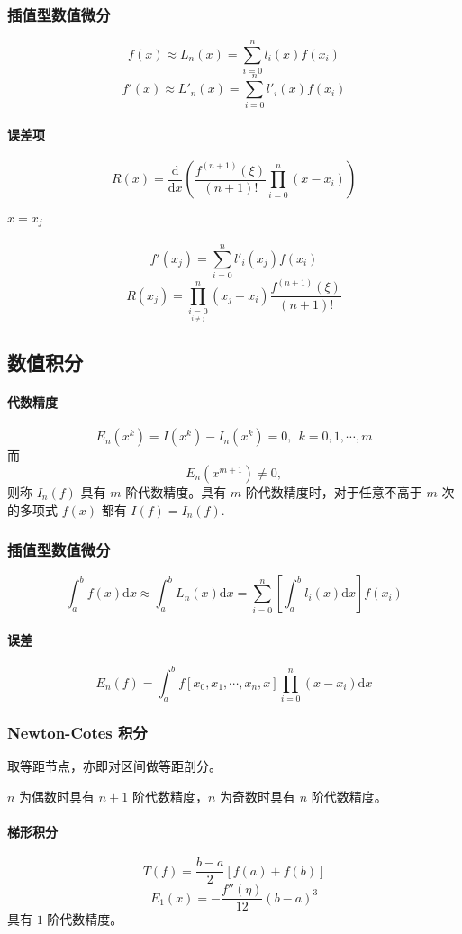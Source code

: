 \documentclass[a4paper,12pt]{article}
\begin{document}
\subsubsection{插值型数值微分}
\[
f(x)\approx L_n(x)=\sum_{i=0}^{n}l_i(x)f(x_i)
\]
\[
f'(x)\approx L'_n(x)=\sum_{i=0}^{n}l'_i(x)f(x_i)
\]
\paragraph{误差项}
\[
R(x)=\frac{\mathrm{d}}{\mathrm{d}x}\left(\frac{f^{(n+1)}(\xi)}{(n+1)!}\prod_{i=0}^{n}(x-x_i)\right)
\]
\paragraph{$x=x_j$}
\[
f'(x_j)=\sum_{i=0}^{n}l'_i(x_j)f(x_i)
\]
\[
R(x_j)=\underset{\underset{i\not=j}{i=0}}{\prod^n}(x_j-x_i)\frac{f^{(n+1)}(\xi)}{(n+1)!}
\]
\subsection{数值积分}
\paragraph{代数精度}
\[
E_n(x^k)=I(x^k)-I_n(x^k)=0,\ \ k=0,1,\cdots,m
\]
而
\[
E_n(x^{m+1})\not=0,
\]
则称 $I_n(f)$ 具有 $m$ 阶代数精度。具有 $m$ 阶代数精度时，对于任意不高于 $m$ 次的多项式 $f(x)$ 都有 $I(f)=I_n(f)$.
\subsubsection{插值型数值微分}
\[
\int_a^b f(x)\mathrm{d}x\approx\int_a^b L_n(x)\mathrm{d}x=\sum_{i=0}^n\left[\int_a^b l_i(x)\mathrm{d}x\right]f(x_i)
\]
\paragraph{误差}
\[
E_n(f)=\int_a^bf[x_0,x_1,\cdots,x_n,x]\prod_{i=0}^{n}(x-x_i)\mathrm{d}x
\]
\subsubsection{Newton-Cotes 积分}
取等距节点，亦即对区间做等距剖分。\par
$n$ 为偶数时具有 $n+1$ 阶代数精度，$n$ 为奇数时具有 $n$ 阶代数精度。
\paragraph{梯形积分}
\[
T(f)=\frac{b-a}{2}[f(a)+f(b)]
\]
\[
E_1(x)=-\frac{f''(\eta)}{12}(b-a)^3
\]
具有 $1$ 阶代数精度。
\end{document}
